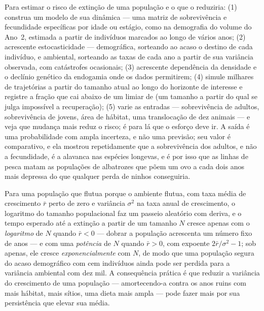 \begin{method}\label{met:b3:conservation-biology:pva}
Para estimar o risco de extinção de uma população e o que o reduziria:
(1) construa um modelo de sua dinâmica --- uma matriz de sobrevivência e
fecundidade específicas por idade ou estágio, como na demografia do
volume do Ano~2, estimada a partir de indivíduos marcados ao longo de
vários anos; (2) acrescente estocasticidade --- demográfica, sorteando ao
acaso o destino de cada indivíduo, e ambiental, sorteando as taxas de
cada ano a partir de sua variância observada, com catástrofes
ocasionais; (3) acrescente dependência da densidade e o declínio genético
da endogamia onde os dados permitirem; (4) simule milhares de
trajetórias a partir do tamanho atual ao longo do horizonte de interesse
e registre a fração que cai abaixo de um limiar de \emph{}
(um tamanho a partir do qual se julga impossível a recuperação); (5)
varie as entradas --- sobrevivência de adultos, sobrevivência de jovens,
área de hábitat, uma translocação de dez animais --- e veja que mudança
mais reduz o risco; é para lá que o esforço deve ir. A saída é uma
probabilidade com ampla incerteza, e não uma previsão; seu valor é
comparativo, e ela mostrou repetidamente que a sobrevivência dos adultos,
e não a fecundidade, é a alavanca nas espécies longevas, e é por isso que
as linhas de pesca matam as populações de albatrozes que põem um ovo a
cada dois anos mais depressa do que qualquer perda de ninhos conseguiria.
\end{method}

\begin{proposition}\label{prop:b3:conservation-biology:time}
Para uma população que flutua porque o ambiente flutua, com taxa média de
crescimento $\bar r$ perto de zero e variância $\sigma^{2}$ na taxa anual
de crescimento, o logaritmo do tamanho populacional faz um passeio
aleatório com deriva, e o tempo esperado até a extinção a partir de um
tamanho $N$ cresce apenas com o \emph{logaritmo} de $N$ quando $\bar r < 0$ --- dobrar a população acrescenta um número fixo de anos --- e com uma
\emph{potência} de $N$ quando $\bar r > 0$, com expoente $2\bar r/\sigma^{2} - 1$; sob  apenas, ele cresce
\emph{exponencialmente} com $N$, de modo que uma população segura do
acaso demográfico com cem indivíduos ainda pode ser perdida para a
variância ambiental com dez mil. A consequência prática é que reduzir a
variância do crescimento de uma população --- amortecendo-a contra os
anos ruins com mais hábitat, mais sítios, uma dieta mais ampla --- pode
fazer mais por sua persistência que elevar sua média.
\end{proposition}
\admitted

